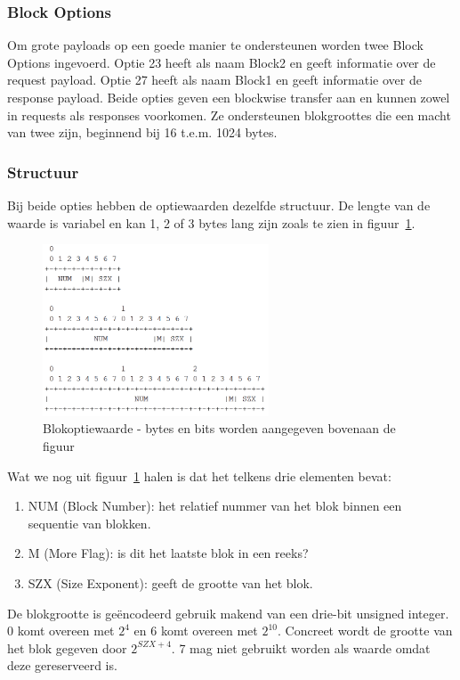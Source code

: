 \subsubsection{Block Options}
Om grote payloads op een goede manier te ondersteunen worden twee Block Options ingevoerd. Optie 23 heeft als naam Block2 en geeft informatie over de request payload. Optie 27 heeft als naam Block1 en geeft informatie over de response payload. Beide opties  geven een blockwise transfer aan en kunnen zowel in requests als responses voorkomen. Ze ondersteunen blokgroottes die een macht van twee zijn, beginnend bij 16 t.e.m. 1024 bytes.

\subsubsection{Structuur}
Bij beide opties hebben de optiewaarden dezelfde structuur. De lengte van de waarde is variabel en kan 1, 2 of 3 bytes lang zijn zoals te zien in figuur~\ref{fig:blockOption}.
\begin{figure}[h]
\centering
\includegraphics[width=0.6\textwidth]{fig/blockOption}
\caption{Blokoptiewaarde - bytes en bits worden aangegeven bovenaan de figuur}
\label{fig:blockOption}
\end{figure}

\noindent
Wat we nog uit figuur~\ref{fig:blockOption} halen is dat het telkens drie elementen bevat:
\begin{enumerate}
\item NUM (Block Number): het relatief nummer van het blok binnen een sequentie van blokken.
\item M (More Flag): is dit het laatste blok in een reeks?
\item SZX (Size Exponent): geeft de grootte van het blok.
\end{enumerate}

\noindent
De blokgrootte is ge\"{e}ncodeerd gebruik makend van een drie-bit unsigned integer. 0 komt overeen met $ 2^{4} $ en 6 komt overeen met  $ 2^{10} $. Concreet wordt de grootte van het blok gegeven door  $ 2^{ SZX + 4} $. 7 mag niet gebruikt worden als waarde omdat deze gereserveerd is.

